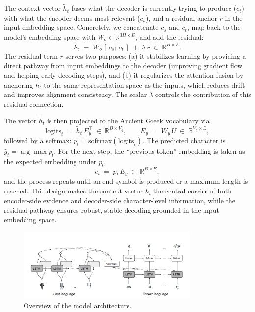 The context vector $\tilde{h}_t$ fuses what the decoder is
currently trying to produce ($c_t$) with what the encoder deems most
relevant ($c_s$), and a residual anchor $r$ in the input embedding
space.
Concretely, we concatenate $c_s$ and $c_t$, map back to the model’s
embedding space with $W_o\in\mathbb{R}^{3H\times E}$, and add the residual:
\[
\tilde{h}_t \;=\; W_o\,[\,c_s;\,c_t\,] \;+\; \lambda\, r
\;\in\; \mathbb{R}^{B\times E}.
\]
The residual term $r$ serves two purposes: (a) it stabilizes learning by
providing a direct pathway from input embeddings to the decoder (improving
gradient flow and helping early decoding steps), and (b) it regularizes the
attention fusion by anchoring $\tilde{h}_t$ to the same representation space
as the inputs, which reduces drift and improves alignment consistency.
The scalar $\lambda$ controls the contribution of this residual connection.

The vector $\tilde{h}_t$ is then projected to the Ancient Greek vocabulary via
\[
\text{logits}_t \;=\; \tilde{h}_t\,E_y^{\top}\;\in\;\mathbb{R}^{B\times V_g},
\qquad
E_y \;=\; W_y\,U \;\in\; \mathbb{R}^{V_g\times E},
\]
followed by a softmax: $p_t=\mathrm{softmax}(\text{logits}_t)$.
The predicted character is $\hat{y}_t=\arg\max p_t$.
For the next step, the “previous-token” embedding is taken as the expected
embedding under $p_t$,
\[
e_t \;=\; p_t\,E_y \;\in\; \mathbb{R}^{B\times E},
\]
and the process repeats until an end symbol is produced or a maximum length is
reached.
This design makes the context vector $\tilde{h}_t$ the central carrier of
both encoder-side evidence and decoder-side character-level information, while the residual pathway
ensures robust, stable decoding grounded in the input embedding space.

\begin{figure}[H]
    \centering
    \includegraphics[width=0.8\textwidth]{Images/luo_model_overview.png} %
    \caption{Overview of the model architecture.\protect\footnotemark}
    \label{fig:luo_model_overview}
\end{figure}





